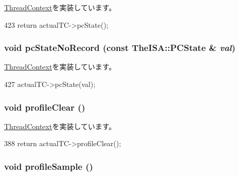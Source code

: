 \hyperlink{classThreadContext_a1aaca26c0732d2191edbde1477d7ec13}{ThreadContext}を実装しています。


\begin{DoxyCode}
423 { return actualTC->pcState(); }
\end{DoxyCode}
\hypertarget{classProxyThreadContext_a6005386aeeaecb35499c3199fb47ba2f}{
\subsubsection[{pcStateNoRecord}]{\setlength{\rightskip}{0pt plus 5cm}void pcStateNoRecord (const TheISA::PCState \& {\em val})}}
\label{classProxyThreadContext_a6005386aeeaecb35499c3199fb47ba2f}


\hyperlink{classThreadContext_aaeee41ee07ac94c41a94512f28a431fa}{ThreadContext}を実装しています。


\begin{DoxyCode}
427 { actualTC->pcState(val); }
\end{DoxyCode}
\hypertarget{classProxyThreadContext_acf9c88860776d7bd752317e8b550a5d5}{
\subsubsection[{profileClear}]{\setlength{\rightskip}{0pt plus 5cm}void profileClear ()}}
\label{classProxyThreadContext_acf9c88860776d7bd752317e8b550a5d5}


\hyperlink{classThreadContext_ac9ebb698bd789f38c55af10256aab7e8}{ThreadContext}を実装しています。


\begin{DoxyCode}
388 { return actualTC->profileClear(); }
\end{DoxyCode}
\hypertarget{classProxyThreadContext_aba547b904bdcf83196f983f79d285caf}{
\subsubsection[{profileSample}]{\setlength{\rightskip}{0pt plus 5cm}void profileSample ()}}
\label{classProxyThreadContext_aba547b904bdcf83196f983f79d285caf}


